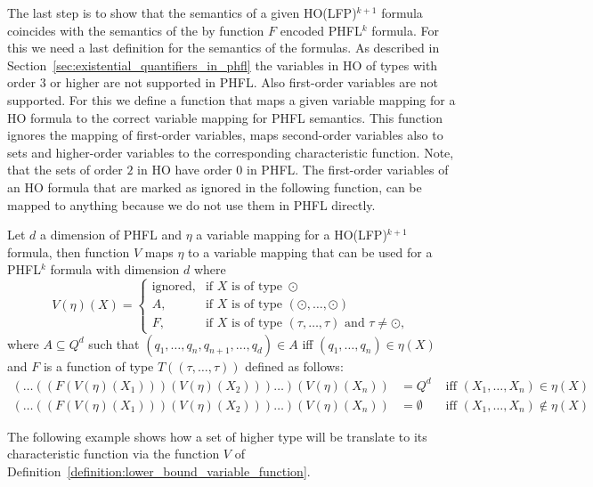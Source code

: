 The last step is to show that the semantics of a given HO(LFP)$^{k+1}$ formula coincides with the semantics of the by
function $F$ encoded PHFL$^k$ formula. For this we need a last definition for the semantics of the formulas. As
described in Section~\ref{sec:existential_quantifiers_in_phfl} the variables in HO of types with order $3$ or higher
are not supported in PHFL. Also first-order variables are not supported. For this we define a function that maps a
given variable mapping for a HO formula to the correct variable mapping for PHFL semantics. This function ignores the
mapping of first-order variables, maps second-order variables also to sets and higher-order variables to the
corresponding characteristic function. Note, that the sets of order $2$ in HO have order $0$ in PHFL. The first-order
variables of an HO formula that are marked as ignored in the following function, can be mapped to anything because we
do not use them in PHFL directly.

\begin{definition}
    \label{definition:lower_bound_variable_function}
    Let $d$ a dimension of PHFL and $\eta$ a variable mapping for a HO(LFP)$^{k+1}$ formula, then function
    $V$ maps $\eta$ to a variable mapping that can be used for a PHFL$^k$ formula with dimension $d$ where
    \[V(\eta)(X)=
    \begin{cases}
        \text{ignored}, & \text{if } X \text{ is of type } \odot \\
        A,  & \text{if } X \text{ is of type } (\odot, \dots, \odot)\\
        F, & \text{if } X \text{ is of type } (\tau, \dots, \tau) \text{ and } \tau \neq \odot,
    \end{cases}\]
    where $A \subseteq Q^d$ such that $(q_1, \dots, q_n, q_{n + 1}, \dots, q_d) \in A$ iff $(q_1, \dots, q_n) \in
    \eta(X)$ and $F$ is a function of type $T((\tau, \dots, \tau))$ defined as follows:
    \begin{align*}
        (\dots((F(V(\eta)(X_1)))(V(\eta)(X_2)))\dots)(V(\eta)(X_n)) &= Q^d &\text{ iff } (X_1, \dots, X_n) \in \eta(X)\\
        (\dots((F(V(\eta)(X_1)))(V(\eta)(X_2)))\dots)(V(\eta)(X_n)) &= \emptyset &\text{ iff } (X_1, \dots, X_n)
        \not\in \eta(X)
    \end{align*}
\end{definition}

The following example shows how a set of higher type will be translate to its characteristic function via the
function $V$ of Definition~\ref{definition:lower_bound_variable_function}.


